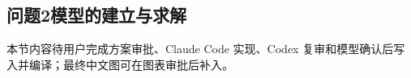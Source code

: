 \subsection{问题2模型的建立与求解}\label{sub:5.2}

本节内容待用户完成方案审批、Claude Code 实现、Codex 复审和模型确认后写入并编译；最终中文图可在图表审批后补入。
